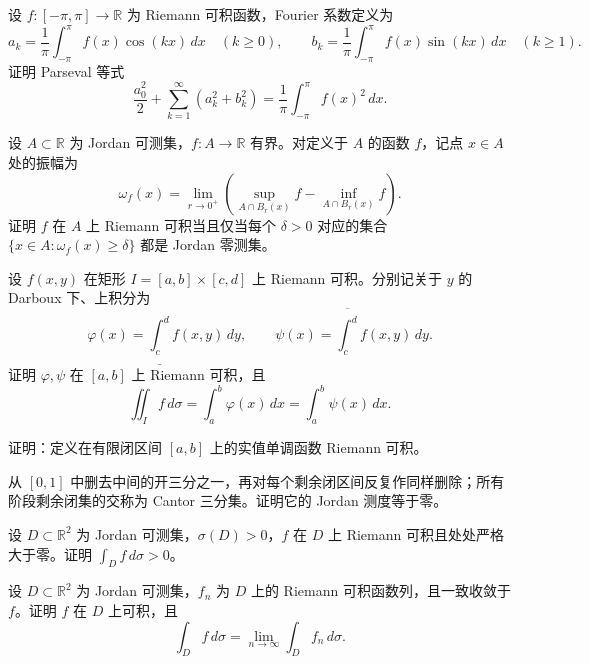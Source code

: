 \noindent\begin{minipage}{\textwidth}
设 $f:[-\pi,\pi]\to\mathbb R$ 为 Riemann 可积函数，Fourier 系数定义为\[a_k=\frac1\pi\int_{-\pi}^{\pi}f(x)\cos(kx)\,dx\quad(k\ge0),\qquad b_k=\frac1\pi\int_{-\pi}^{\pi}f(x)\sin(kx)\,dx\quad(k\ge1).\]证明 Parseval 等式\[\frac{a_0^2}{2}+\sum_{k=1}^{\infty}(a_k^2+b_k^2)=\frac1\pi\int_{-\pi}^{\pi}f(x)^2\,dx.\]
\end{minipage}\par\vfill
\newpage
\noindent\begin{minipage}{\textwidth}
设 $A\subset\mathbb R$ 为 Jordan 可测集，$f:A\to\mathbb R$ 有界。对定义于 $A$ 的函数 $f$，记点 $x\in A$ 处的振幅为\[\omega_f(x)=\lim_{r\to0^+}\left(\sup_{A\cap B_r(x)}f-\inf_{A\cap B_r(x)}f\right).\]证明 $f$ 在 $A$ 上 Riemann 可积当且仅当每个 $\delta>0$ 对应的集合 $\{x\in A:\omega_f(x)\ge\delta\}$ 都是 Jordan 零测集。
\end{minipage}\par\vfill
\noindent\begin{minipage}{\textwidth}
设 $f(x,y)$ 在矩形 $I=[a,b]\times[c,d]$ 上 Riemann 可积。分别记关于 $y$ 的 Darboux 下、上积分为\[\varphi(x)=\underline{\int_c^d}f(x,y)\,dy,\qquad\psi(x)=\overline{\int_c^d}f(x,y)\,dy.\]证明 $\varphi,\psi$ 在 $[a,b]$ 上 Riemann 可积，且\[\iint_I f\,d\sigma=\int_a^b\varphi(x)\,dx=\int_a^b\psi(x)\,dx.\]
\end{minipage}\par\vfill
\noindent\begin{minipage}{\textwidth}
证明：定义在有限闭区间 $[a,b]$ 上的实值单调函数 Riemann 可积。
\end{minipage}\par\vfill
\noindent\begin{minipage}{\textwidth}
从 $[0,1]$ 中删去中间的开三分之一，再对每个剩余闭区间反复作同样删除；所有阶段剩余闭集的交称为 Cantor 三分集。证明它的 Jordan 测度等于零。
\end{minipage}\par\vfill
\newpage
\noindent\begin{minipage}{\textwidth}
设 $D\subset\mathbb R^2$ 为 Jordan 可测集，$\sigma(D)>0$，$f$ 在 $D$ 上 Riemann 可积且处处严格大于零。证明 $\int_D f\,d\sigma>0$。
\end{minipage}\par\vfill
\noindent\begin{minipage}{\textwidth}
设 $D\subset\mathbb R^2$ 为 Jordan 可测集，$f_n$ 为 $D$ 上的 Riemann 可积函数列，且一致收敛于 $f$。证明 $f$ 在 $D$ 上可积，且\[\int_D f\,d\sigma=\lim_{n\to\infty}\int_D f_n\,d\sigma.\]
\end{minipage}\par\vfill
